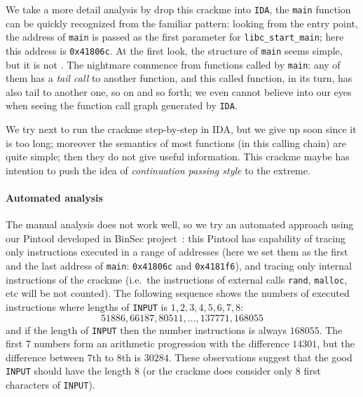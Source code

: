 \documentclass{easychair}
\begin{document}
We take a more detail analysis by drop this crackme into \texttt{IDA}, the \texttt{main} function can be quickly recognized from the familiar pattern: looking from the entry point, the address of \texttt{main} is passed as the first parameter for \texttt{libc\_start\_main}; here this address is \texttt{0x41806c}. At the first look, the structure of \texttt{main} seems simple, but it is not \frownie{}. The nightmare commence from functions called by \texttt{main}: any of them has a \emph{tail call} to another function, and this called function, in its turn, has also tail to another one, so on and so forth; we even cannot believe into our eyes when seeing the function call graph generated by \texttt{IDA}. 

We try next to run the crackme step-by-step in IDA, but we give up soon since it is too long; moreover the semantics of most functions (in this calling chain) are quite simple; then they do not give useful information. This crackme maybe has intention to push the idea of \emph{continuation passing style} to the extreme.

\paragraph{Automated analysis}
The manual analysis does not work well, so we try an automated approach using our Pintool developed in BinSec project~\autocite{binsec}: this Pintool has capability of tracing only instructions executed in a range of addresses (here we set them as the first and the last address of \texttt{main}: \texttt{0x41806c} and \texttt{0x4181f6}), and tracing only internal instructions of the crackme (i.e.~the instructions of external calls \texttt{rand}, \texttt{malloc}, etc will be not counted). The following sequence shows the numbers of executed instructions where lengths of \texttt{INPUT} is $1, 2, 3, 4, 5, 6, 7, 8$:
\begin{equation*}
  51886, 66187, 80511, \dots, 137771, 168055
\end{equation*}
and if the length of \texttt{INPUT} then the number instructions is always $168055$. The first $7$ numbers form an arithmetic progression with the difference $14301$, but the difference between $7$th to $8$th is $30284$. These observations suggest that the good \texttt{INPUT} should have the length $8$ (or the crackme does consider only $8$ first characters of \texttt{INPUT}).
\end{document}

